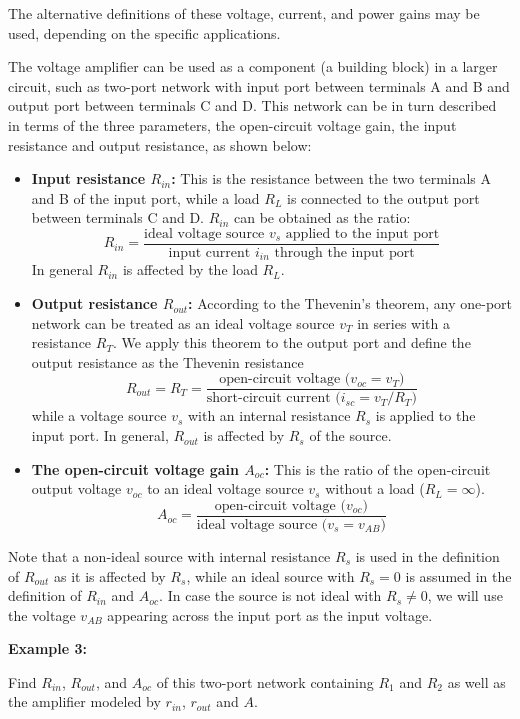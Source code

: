 The alternative definitions of these voltage, current, and power gains may be
used, depending on the specific applications.

The voltage amplifier can be used as a component (a building block) in a 
larger circuit, such as two-port network with input port between terminals 
A and B and output port between terminals C and D. This network can be in turn 
described in terms of the three parameters, the open-circuit voltage gain,
the input resistance and output resistance, as shown below:
\begin{itemize}
\item {\bf Input resistance $R_{in}$:} This is the resistance between the two 
  terminals A and B of the input port, while a load $R_L$ is connected to the 
  output port between terminals C and D. $R_{in}$ can be obtained as the ratio:
  \[ R_{in}=\frac{\mbox{ideal voltage source $v_s$ applied to the input port}}{\mbox{input current $i_{in}$ through the input port}} \]
  In general $R_{in}$ is affected by the load $R_L$.
\item {\bf Output resistance $R_{out}$:} According to the Thevenin's theorem, 
  any one-port network can be treated as an ideal voltage source $v_T$ in series 
  with a resistance $R_T$. We apply this theorem to the output port and define
  the output resistance as the Thevenin resistance 
  \[ R_{out}=R_T=\frac{\mbox{open-circuit voltage ($v_{oc}=v_T$)}}{\mbox{short-circuit current ($i_{sc}=v_T/R_T$)}} \]
  while a voltage source $v_s$ with an internal resistance $R_s$ is applied to 
  the input port. In general, $R_{out}$ is affected by $R_s$ of the source.
\item {\bf The open-circuit voltage gain $A_{oc}$:} This is the ratio of the 
  open-circuit output voltage $v_{oc}$ to an ideal voltage source $v_s$ without 
  a load ($R_L=\infty$).
  \[ A_{oc}=\frac{\mbox{open-circuit voltage ($v_{oc}$)}}{\mbox{ideal voltage source ($v_s=v_{AB}$)}}\]
\end{itemize}
Note that a non-ideal source with internal resistance $R_s$ is used in the definition
of $R_{out}$ as it is affected by $R_s$, while an ideal source with $R_s=0$ is 
assumed in the definition of $R_{in}$ and $A_{oc}$. In case the source is not
ideal with $R_s\ne 0$, we will use the voltage $v_{AB}$ appearing across the input
port as the input voltage.

{\bf Example 3:} 


Find $R_{in}$, $R_{out}$, and $A_{oc}$ of this two-port network containing
$R_1$ and $R_2$ as well as the amplifier modeled by $r_{in}$, $r_{out}$ and $A$. 


